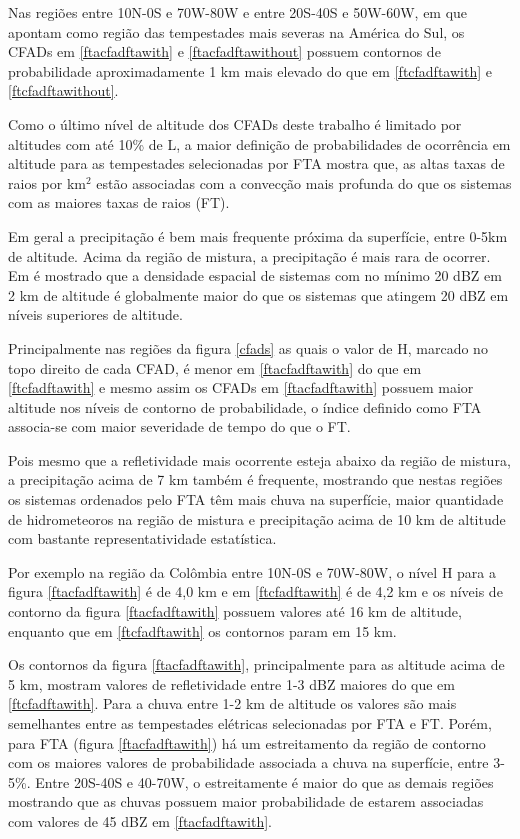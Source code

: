 \documentclass[preprint,authoryear,3p]{elsarticle}
\begin{document}
\begin{multicols}{2}
Nas regiões entre 10N-0S e 70W-80W e entre 20S-40S e 50W-60W, em que \cite{cecil2005} apontam como região das tempestades mais severas na América do Sul, os CFADs em \ref{ftacfadftawith} e \ref{ftacfadftawithout} possuem contornos de probabilidade aproximadamente 1 km mais elevado do que em \ref{ftcfadftawith} e \ref{ftcfadftawithout}.

Como o último nível de altitude dos CFADs deste trabalho é limitado por altitudes com até 10\% de L, a maior definição de probabilidades de ocorrência em altitude para as tempestades selecionadas por FTA mostra que, as altas taxas de raios por km$^2$ estão associadas com a convecção mais profunda do que os sistemas com as maiores taxas de raios (FT).

Em geral a precipitação é bem mais frequente próxima da superfície, entre 0-5km de altitude. Acima da região de mistura, a precipitação é mais rara de ocorrer. Em \cite{liu2008} é mostrado que a densidade espacial de sistemas com no mínimo 20 dBZ em 2 km de altitude é globalmente maior do que os sistemas que atingem 20 dBZ em níveis superiores de altitude.

Principalmente nas regiões da figura \ref{cfads} as quais o valor de H, marcado no topo direito de cada CFAD, é menor em \ref{ftacfadftawith} do que em \ref{ftcfadftawith} e mesmo assim os CFADs em \ref{ftacfadftawith} possuem maior altitude nos níveis de contorno de probabilidade, o índice definido como FTA associa-se com maior severidade de tempo do que o FT. 

Pois mesmo que a refletividade mais ocorrente esteja abaixo da região de mistura, a precipitação acima de 7 km também é frequente, mostrando que nestas regiões os sistemas ordenados pelo FTA têm mais chuva na superfície, maior quantidade de hidrometeoros na região de mistura e precipitação acima de 10 km de altitude com bastante representatividade estatística.

Por exemplo na região da Colômbia entre 10N-0S e 70W-80W, o nível H para a figura \ref{ftacfadftawith} é de 4,0 km e em \ref{ftcfadftawith} é de 4,2 km e os níveis de contorno da figura \ref{ftacfadftawith} possuem valores até 16 km de altitude, enquanto que em \ref{ftcfadftawith} os contornos param em 15 km. 

Os contornos da figura \ref{ftacfadftawith}, principalmente para as altitude acima de 5 km, mostram valores de refletividade entre 1-3 dBZ  maiores do que em \ref{ftcfadftawith}. Para a chuva entre 1-2 km de altitude os valores são mais semelhantes entre as tempestades elétricas selecionadas por FTA e FT. Porém, para FTA (figura \ref{ftacfadftawith}) há um estreitamento da região de contorno com os maiores valores de probabilidade associada a chuva na superfície, entre 3-5\%. Entre 20S-40S e 40-70W, o estreitamente é maior do que as demais regiões mostrando que as chuvas possuem maior probabilidade de estarem associadas com valores de 45 dBZ em \ref{ftacfadftawith}.      


\end{multicols}
\end{document}
